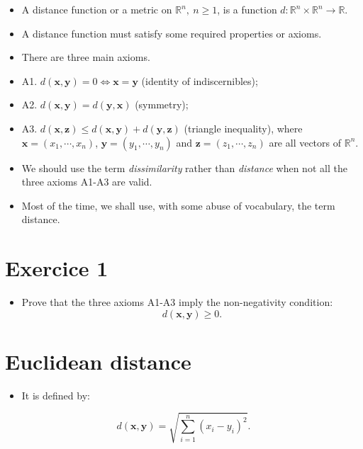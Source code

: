 \documentclass[
]{article}
\providecommand{\tightlist}{%
  \setlength{\itemsep}{0pt}\setlength{\parskip}{0pt}}
\begin{document}
\begin{itemize}
\tightlist
\item
  A distance function or a metric on \(\mathbb{R}^n,\:n\geq 1\), is a
  function \(d:\mathbb{R}^n\times\mathbb{R}^n\rightarrow \mathbb{R}\).
\item
  A distance function must satisfy some required properties or axioms.
\item
  There are three main axioms.
\item
  A1. \(d(\mathbf{x},\mathbf{y})= 0\iff \mathbf{x}=\mathbf{y}\)
  (identity of indiscernibles);
\item
  A2. \(d(\mathbf{x},\mathbf{y})= d(\mathbf{y},\mathbf{x})\) (symmetry);
\item
  A3.
  \(d(\mathbf{x},\mathbf{z})\leq d(\mathbf{x},\mathbf{y})+d(\mathbf{y},\mathbf{z})\)
  (triangle inequality), where \(\mathbf{x}=(x_1,\cdots,x_n)\),
  \(\mathbf{y}=(y_1,\cdots,y_n)\) and \(\mathbf{z}=(z_1,\cdots,z_n)\)
  are all vectors of \(\mathbb{R}^n\).
\item
  We should use the term \emph{dissimilarity} rather than
  \emph{distance} when not all the three axioms A1-A3 are valid.
\item
  Most of the time, we shall use, with some abuse of vocabulary, the
  term distance.
\end{itemize}

\hypertarget{exercice-1}{%
\section{Exercice 1}\label{exercice-1}}

\begin{itemize}
\tightlist
\item
  Prove that the three axioms A1-A3 imply the non-negativity condition:
  \[d(\mathbf{x},\mathbf{y})\geq 0.\]
\end{itemize}

\hypertarget{euclidean-distance}{%
\section{Euclidean distance}\label{euclidean-distance}}

\begin{itemize}
\tightlist
\item
  It is defined by:
\end{itemize}

\[d(\mathbf{x},\mathbf{y})=\sqrt{\sum_{i=1}^n (x_i-y_i)^2}.\]
\end{document}
